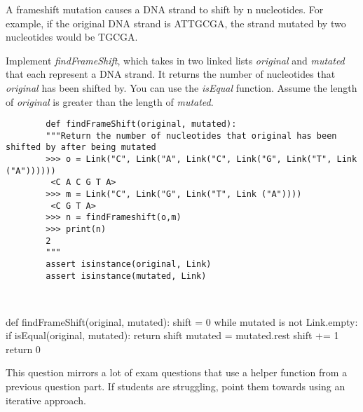 

\begin{blocksection}
    \question A frameshift mutation causes a DNA strand to shift by n nucleotides. For example, if the original DNA strand is ATTGCGA, the strand mutated by two nucleotides would be TGCGA. 
    
    
    Implement \textit{findFrameShift}, which takes in two linked lists \textit{original} and \textit{mutated} that each represent a DNA strand. It returns the number of nucleotides that \textit{original} has been shifted by. You can use the \textit{isEqual} function. Assume the length of \textit{original} is greater than the length of \textit{mutated}. 

    
    
    \begin{lstlisting}
        def findFrameShift(original, mutated):
        """Return the number of nucleotides that original has been shifted by after being mutated
        >>> o = Link("C", Link("A", Link("C", Link("G", Link("T", Link ("A")))))) 
         <C A C G T A>
        >>> m = Link("C", Link("G", Link("T", Link ("A")))) 
         <C G T A>
        >>> n = findFrameshift(o,m)
        >>> print(n)
        2
        """
        assert isinstance(original, Link)
        assert isinstance(mutated, Link)
        	
        
    \end{lstlisting}
    
    \begin{solution}
        def findFrameShift(original, mutated):
            shift = 0
            while mutated is not Link.empty:
                if isEqual(original, mutated):
                    return shift
                mutated = mutated.rest
                shift += 1
            return 0

    \end{solution}
    \end{blocksection}
    
    \begin{questionmeta}
        This question mirrors a lot of exam questions that use a helper function from a previous question part. If students are struggling, point them towards using an iterative approach. 
    \end{questionmeta}
    